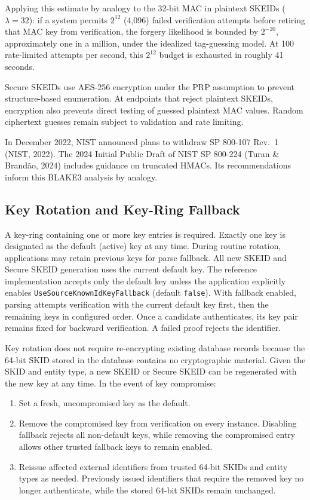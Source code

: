 \documentclass[fleqn,10pt]{wlpeerj}
\providecommand{\tightlist}{%
  \setlength{\itemsep}{0pt}\setlength{\parskip}{0pt}}
\begin{document}
Applying this estimate by analogy to the 32-bit MAC in plaintext SKEIDs
(\(\lambda = 32\)): if a system permits \(2^{12}\) (4,096) failed
verification attempts before retiring that MAC key from verification,
the forgery likelihood is bounded by \(2^{-20}\), approximately one in a
million, under the idealized tag-guessing model. At 100 rate-limited
attempts per second, this \(2^{12}\) budget is exhausted in roughly 41
seconds.

Secure SKEIDs use AES-256 encryption under the PRP assumption to prevent
structure-based enumeration. At endpoints that reject plaintext SKEIDs,
encryption also prevents direct testing of guessed plaintext MAC values.
Random ciphertext guesses remain subject to validation and rate
limiting.

In December 2022, NIST announced plans to withdraw SP 800-107 Rev.~1
(NIST, 2022). The 2024 Initial Public Draft of NIST SP 800-224 (Turan \&
Brandão, 2024) includes guidance on truncated HMACs. Its recommendations
inform this BLAKE3 analysis by analogy.

\subsection{Key Rotation and Key-Ring
Fallback}\label{key-rotation-and-key-ring-fallback}

A key-ring containing one or more key entries is required. Exactly one
key is designated as the default (active) key at any time. During
routine rotation, applications may retain previous keys for parse
fallback. All new SKEID and Secure SKEID generation uses the current
default key. The reference implementation accepts only the default key
unless the application explicitly enables
\texttt{UseSourceKnownIdKeyFallback} (default \texttt{false}). With
fallback enabled, parsing attempts verification with the current default
key first, then the remaining keys in configured order. Once a candidate
authenticates, its key pair remains fixed for backward verification. A
failed proof rejects the identifier.

Key rotation does not require re-encrypting existing database records
because the 64-bit SKID stored in the database contains no cryptographic
material. Given the SKID and entity type, a new SKEID or Secure SKEID
can be regenerated with the new key at any time. In the event of key
compromise:

\begin{enumerate}
\def\labelenumi{\arabic{enumi}.}
\tightlist
\item
  Set a fresh, uncompromised key as the default.
\item
  Remove the compromised key from verification on every instance.
  Disabling fallback rejects all non-default keys, while removing the
  compromised entry allows other trusted fallback keys to remain
  enabled.
\item
  Reissue affected external identifiers from trusted 64-bit SKIDs and
  entity types as needed. Previously issued identifiers that require the
  removed key no longer authenticate, while the stored 64-bit SKIDs
  remain unchanged.
\end{enumerate}
\end{document}
